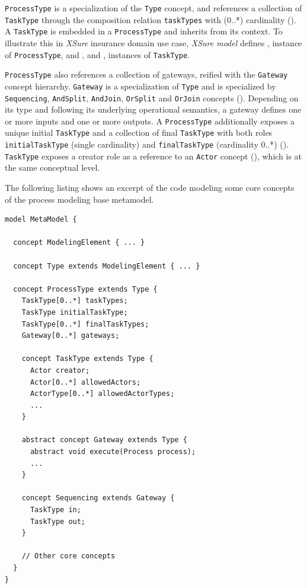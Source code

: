 \texttt{ProcessType} is a specialization of the \texttt{Type} concept, and
references a collection of \texttt{TaskType} through the composition relation
\texttt{taskTypes} with (0..*) cardinality (). A \texttt{TaskType}
is embedded in a \texttt{ProcessType} and inherits from its context. To
illustrate this in \textit{XSure} insurance domain use case, \textit{XSure
model} defines , instance of \texttt{ProcessType}, and
,  and , instances of
\texttt{TaskType}.

\texttt{ProcessType} also references a collection of gateways, reified with the
\texttt{Gateway} concept hierarchy. \texttt{Gateway} is a specialization of
\texttt{Type} and is specialized by \texttt{Sequencing}, \texttt{AndSplit},
\texttt{AndJoin}, \texttt{OrSplit} and \texttt{OrJoin} concepts ().
Depending on its type and following its underlying operational semantics, a
gateway defines one or more inputs and one or more outputs. A
\texttt{ProcessType} additionally exposes a unique initial \texttt{TaskType}
and a collection of final \texttt{TaskType} with both roles
\texttt{initialTaskType} (single cardinality) and \texttt{finalTaskType}
(cardinality 0..*) (). \texttt{TaskType} exposes a creator role as a
reference to an \texttt{Actor} concept (), which is at the same
conceptual level.

The following listing shows an excerpt of the \FML code modeling some core
concepts of the process modeling base metamodel.

\begin{lstlisting}
model MetaModel {

  concept ModelingElement { ... }

  concept Type extends ModelingElement { ... }

  concept ProcessType extends Type {
    TaskType[0..*] taskTypes;
    TaskType initialTaskType;
    TaskType[0..*] finalTaskTypes;
    Gateway[0..*] gateways;

    concept TaskType extends Type {
      Actor creator;
      Actor[0..*] allowedActors;
      ActorType[0..*] allowedActorTypes;
      ...
    }

    abstract concept Gateway extends Type {
      abstract void execute(Process process);
      ...
    }

    concept Sequencing extends Gateway {
      TaskType in;
      TaskType out;
    }

    // Other core concepts
  }
}
\end{lstlisting}

